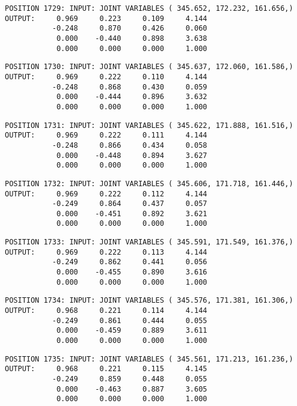 \begin{verbatim}
POSITION 1729: INPUT: JOINT VARIABLES ( 345.652, 172.232, 161.656,)
OUTPUT:     0.969     0.223     0.109     4.144
           -0.248     0.870     0.426     0.060
            0.000    -0.440     0.898     3.638
            0.000     0.000     0.000     1.000
\end{verbatim} \pagebreak[1]\begin{verbatim}
POSITION 1730: INPUT: JOINT VARIABLES ( 345.637, 172.060, 161.586,)
OUTPUT:     0.969     0.222     0.110     4.144
           -0.248     0.868     0.430     0.059
            0.000    -0.444     0.896     3.632
            0.000     0.000     0.000     1.000
\end{verbatim} \pagebreak[1]\begin{verbatim}
POSITION 1731: INPUT: JOINT VARIABLES ( 345.622, 171.888, 161.516,)
OUTPUT:     0.969     0.222     0.111     4.144
           -0.248     0.866     0.434     0.058
            0.000    -0.448     0.894     3.627
            0.000     0.000     0.000     1.000
\end{verbatim} \pagebreak[1]\begin{verbatim}
POSITION 1732: INPUT: JOINT VARIABLES ( 345.606, 171.718, 161.446,)
OUTPUT:     0.969     0.222     0.112     4.144
           -0.249     0.864     0.437     0.057
            0.000    -0.451     0.892     3.621
            0.000     0.000     0.000     1.000
\end{verbatim} \pagebreak[1]\begin{verbatim}
POSITION 1733: INPUT: JOINT VARIABLES ( 345.591, 171.549, 161.376,)
OUTPUT:     0.969     0.222     0.113     4.144
           -0.249     0.862     0.441     0.056
            0.000    -0.455     0.890     3.616
            0.000     0.000     0.000     1.000
\end{verbatim} \pagebreak[1]\begin{verbatim}
POSITION 1734: INPUT: JOINT VARIABLES ( 345.576, 171.381, 161.306,)
OUTPUT:     0.968     0.221     0.114     4.144
           -0.249     0.861     0.444     0.055
            0.000    -0.459     0.889     3.611
            0.000     0.000     0.000     1.000
\end{verbatim} \pagebreak[1]\begin{verbatim}
POSITION 1735: INPUT: JOINT VARIABLES ( 345.561, 171.213, 161.236,)
OUTPUT:     0.968     0.221     0.115     4.145
           -0.249     0.859     0.448     0.055
            0.000    -0.463     0.887     3.605
            0.000     0.000     0.000     1.000
\end{verbatim} \pagebreak[1]\begin{verbatim}

\end{verbatim}
